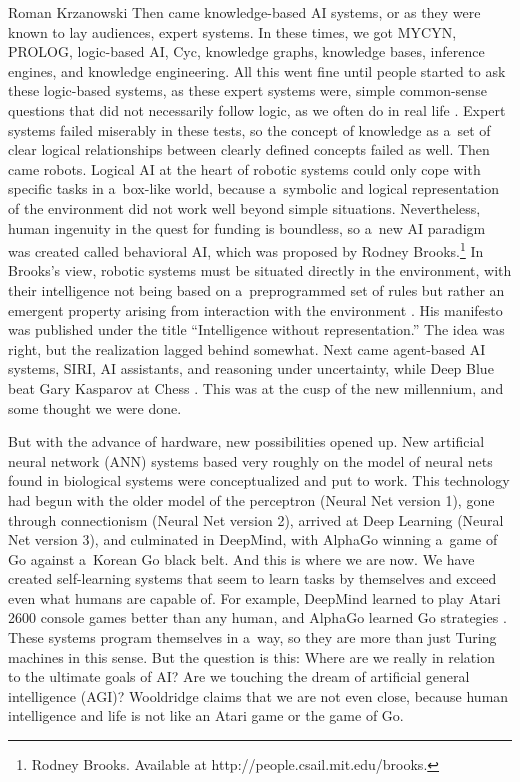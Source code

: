 \begin{newrevengenv}{Roman Krzanowski}
Then came knowledge-based AI systems, or as they were known to lay audiences, expert systems. In these times, we got MYCYN, PROLOG, logic-based AI, Cyc, knowledge graphs, knowledge bases, inference engines, and knowledge engineering. All this went fine until people started to ask these logic-based systems, as these expert systems were, simple common-sense questions that did not necessarily follow logic, as we often do in real life
\parencite[][pp.89–123]{wooldridge_road_2021}.
Expert systems failed miserably in these tests, so the concept of knowledge as a~set of clear logical relationships between clearly defined concepts failed as well. Then came robots. Logical AI at the heart of robotic systems could only cope with specific tasks in a~box-like world, because a~symbolic and logical representation of the environment did not work well beyond simple situations. Nevertheless, human ingenuity in the quest for funding is boundless, so a~new AI paradigm was created called behavioral AI, which was proposed by Rodney Brooks.\footnote{Rodney Brooks. Available at http://people.csail.mit.edu/brooks.} In Brooks’s view, robotic systems must be situated directly in the environment, with their intelligence not being based on a~preprogrammed set of rules but rather an emergent property arising from interaction with the environment
\parencite[][pp.126–127]{wooldridge_road_2021}.
His manifesto was published under the title ``Intelligence without representation.''
\parencite{brooks_intelligence_1991}
The idea was right, but the realization lagged behind somewhat. Next came agent-based AI systems, SIRI, AI assistants, and reasoning under uncertainty, while Deep Blue beat Gary Kasparov at Chess
\parencite[][pp.125–165]{wooldridge_road_2021}.
This was at the cusp of the new millennium, and some thought we were done.

But with the advance of hardware, new possibilities opened up. New artificial neural network (ANN) systems based very roughly on the model of neural nets found in biological systems were conceptualized and put to work. This technology had begun with the older model of the perceptron (Neural Net version 1), gone through connectionism (Neural Net version 2), arrived at Deep Learning (Neural Net version 3), and culminated in DeepMind, with AlphaGo winning a~game of Go against a~Korean Go black belt. And this is where we are now. We have created self-learning systems that seem to learn tasks by themselves and exceed even what humans are capable of. For example, DeepMind learned to play Atari 2600 console games better than any human, and AlphaGo learned Go strategies
\parencite[][pp.167–210]{wooldridge_road_2021}.
These systems program themselves in a~way, so they are more than just Turing machines in this sense. But the question is this: Where are we really in relation to the ultimate goals of AI? Are we touching the dream of artificial general intelligence (AGI)? Wooldridge claims that we are not even close, because human intelligence and life is not like an Atari game or the game of Go.


\end{newrevengenv}
